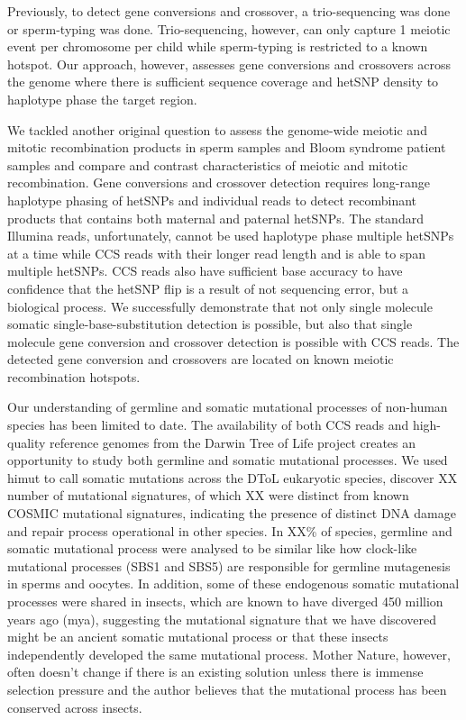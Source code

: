 Previously, to detect gene conversions and crossover, a trio-sequencing was done or sperm-typing was done. Trio-sequencing, however, can only capture 1 meiotic event per chromosome per child while sperm-typing is restricted to a known hotspot. Our approach, however, assesses gene conversions and crossovers across the genome where there is sufficient sequence coverage and hetSNP density to haplotype phase the target region.

We tackled another original question to assess the genome-wide meiotic and mitotic recombination products in sperm samples and Bloom syndrome patient samples and compare and contrast characteristics of meiotic and mitotic recombination. Gene conversions and crossover detection requires long-range haplotype phasing of hetSNPs and individual reads to detect recombinant products that contains both maternal and paternal hetSNPs. The standard Illumina reads, unfortunately, cannot be used haplotype phase multiple hetSNPs at a time while CCS reads with their longer read length and is able to span multiple hetSNPs. CCS reads also have sufficient base accuracy to have confidence that the hetSNP flip is a result of not sequencing error, but a biological process. We successfully demonstrate that not only single molecule somatic single-base-substitution detection is possible, but also that single molecule gene conversion and crossover detection is possible with CCS reads. The detected gene conversion and crossovers are located on known meiotic recombination hotspots. 


Our understanding of germline and somatic mutational processes of non-human species has been limited to date. The availability of both CCS reads and high-quality reference genomes from the Darwin Tree of Life project creates an opportunity to study both germline and somatic mutational processes. We used himut to call somatic mutations across the DToL eukaryotic species, discover XX number of mutational signatures, of which XX were distinct from known COSMIC mutational signatures, indicating the presence of distinct DNA damage and repair process operational in other species. In XX\% of species, germline and somatic mutational process were analysed to be similar like how clock-like mutational processes (SBS1 and SBS5) are responsible for germline mutagenesis in sperms and oocytes. In addition, some of these endogenous somatic mutational processes were shared in insects, which are known to have diverged 450 million years ago (mya), suggesting the mutational signature that we have discovered might be an ancient somatic mutational process or that these insects independently developed the same mutational process. Mother Nature, however, often doesn’t change if there is an existing solution unless there is immense selection pressure and the author believes that the mutational process has been conserved across insects. 

